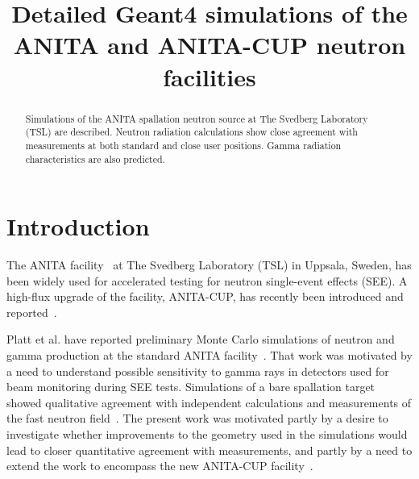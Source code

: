 \documentclass[peerreviewca,11pt,a4paper]{IEEEtran}
\begin{document}
\title{
    Detailed Geant4 simulations of the ANITA and ANITA-CUP neutron facilities
}

\author{
}

\maketitle

\begin{abstract}
    Simulations of the ANITA spallation neutron source at The Svedberg Laboratory (TSL) are described.
    Neutron radiation calculations show close agreement with measurements at both standard and close user positions.
    Gamma radiation characteristics are also predicted.
\end{abstract}

\IEEEpeerreviewmaketitle

\section{Introduction}

The ANITA facility~\cite{Prokofiev2009} at The Svedberg Laboratory (TSL) in Uppsala, Sweden, has been widely used for accelerated testing for neutron single-event effects (SEE).
A high-flux upgrade of the facility, ANITA-CUP, has recently been introduced and reported~\cite{Prokofiev2014}.

Platt et al. have reported preliminary Monte Carlo simulations of neutron and gamma production at the standard ANITA facility~\cite{Platt2013}.
That work was motivated by a need to understand possible sensitivity to gamma rays in detectors used for beam monitoring during SEE tests.
Simulations of a bare spallation target showed qualitative agreement with independent calculations and measurements of the fast neutron field~\cite{Prokofiev2009}.
The present work was motivated partly by a desire to investigate whether improvements to the geometry used in the simulations would lead to closer quantitative agreement with measurements, and partly by a need to extend the work to encompass the new ANITA-CUP facility~\cite{Prokofiev2014}.
\end{document}
